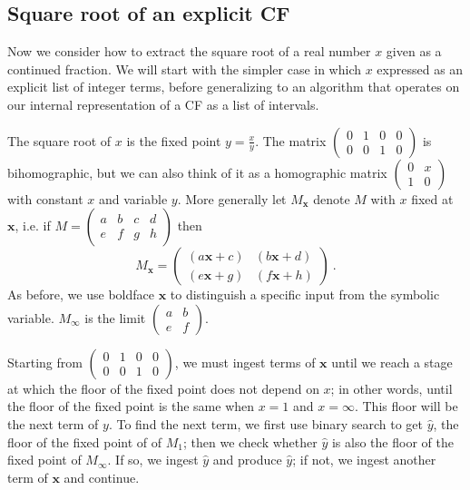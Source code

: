 \documentclass[11pt, oneside]{amsart}   	%
\newcommand{\abcd}{\left(
\begin{smallmatrix} 
a & b & c & d\\ 
e & f & g & h
\end{smallmatrix}
\right)}
\renewcommand{\:}{\negthickspace:\negthickspace}
\begin{document}
\subsection{Square root of an explicit CF}
Now we consider how to extract the square root of a real number $x$ given as a continued fraction. We will start 
with the simpler case in which $x$ expressed as an explicit list of integer terms, before generalizing to an algorithm that
operates on our internal representation of a CF as a list of intervals.

The square root of $x$ is the fixed point $y = \frac{x}{y}$. The matrix $\left(
\begin{smallmatrix} 
0 & 1 & 0 & 0\\ 
0 & 0 & 1 & 0
\end{smallmatrix}
\right)$
is bihomographic, but we can also think of it as a homographic
matrix $\left(
\begin{smallmatrix} 
0 & x \\ 
1 & 0 
\end{smallmatrix}
\right)$ with constant $x$ and variable $y$. More generally let $M_{\mathbf{x}}$ denote $M$ with $x$ fixed at $\mathbf{x}$,
i.e. if $M=\abcd$ then
\[
M_{\mathbf{x}} = \begin{pmatrix}
                                (a\mathbf{x}+c) & (b\mathbf{x}+d)\\
                                (e\mathbf{x}+g) & (f\mathbf{x}+h)
                                \end{pmatrix}\ .
\]
As before, we use boldface $\mathbf{x}$ to distinguish a specific input from the symbolic variable. $M_{\infty}$ is the limit $\left(
\begin{smallmatrix} 
a & b \\ 
e & f 
\end{smallmatrix}
\right)$.

Starting from $\left(
\begin{smallmatrix} 
0 & 1 & 0 & 0\\ 
0 & 0 & 1 & 0
\end{smallmatrix}
\right)$, we must ingest terms of $\mathbf{x}$ until we reach a stage at which the floor of the fixed point does not depend on $x$;
in other words, until the floor of the fixed point is the same when $x=1$ and $x=\infty$. This floor will be the next term of $y$.
To find the next term, we first use binary search to get $\hat{y}$, the floor of the fixed point of of $M_1$; 
then we check whether $\hat{y}$ is also the floor of the fixed point of  $M_{\infty}$. If so, we ingest
$\hat{y}$ and produce $\hat{y}$; if not, we ingest another term of $\mathbf{x}$ and continue.
\end{document}
